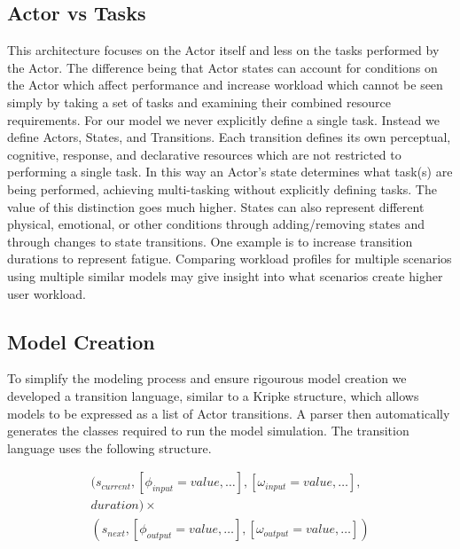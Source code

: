 \subsection{Actor vs Tasks}
This architecture focuses on the Actor itself and less on the tasks performed by
the Actor.  The difference being that Actor states can account for conditions on
the Actor which affect performance and increase workload which cannot be seen
simply by taking a set of tasks and examining their combined resource
requirements.  For our model we never explicitly define a single task.  Instead
we define Actors, States, and Transitions.  Each transition defines its own
perceptual, cognitive, response, and declarative resources\cite{salvucci2008threaded} which are
not restricted to performing a single task.  In this way an Actor's state
determines what task(s) are being performed, achieving multi-tasking without
explicitly defining tasks.  The value of this distinction goes much higher. 
States can also represent different physical, emotional, or other conditions
through adding/removing states and through changes to state transitions. One
example is to increase transition durations to represent fatigue.
Comparing workload profiles for multiple scenarios using multiple
similar models may give insight into what scenarios create higher user workload.

\subsection{Model Creation}
To simplify the modeling process and ensure rigourous model creation we
developed a transition language, similar to a Kripke structure, which allows
models to be expressed as a list of Actor transitions.  A parser then
automatically generates the classes required to run the model simulation.
The transition language uses the following structure.

\begin{equation}
\begin{split}
(s_{current}, [\phi_{input} = value,\ldots], [\omega_{input} = value,\ldots],\\
duration) \times \\
(s_{next}, [\phi_{output} =
value,\ldots], [\omega_{output} = value,\ldots])
\end{split}
\end{equation}
